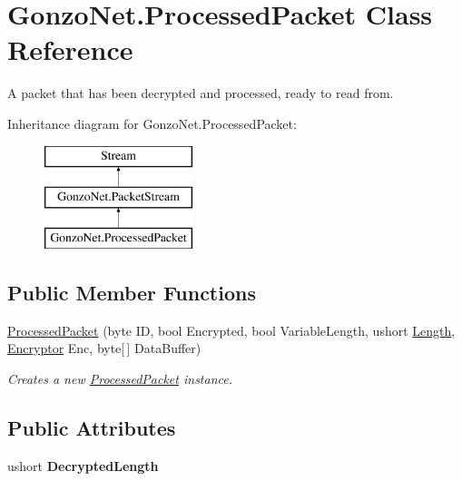 \hypertarget{class_gonzo_net_1_1_processed_packet}{\section{Gonzo\+Net.\+Processed\+Packet Class Reference}
\label{class_gonzo_net_1_1_processed_packet}
}


A packet that has been decrypted and processed, ready to read from.  


Inheritance diagram for Gonzo\+Net.\+Processed\+Packet\+:\begin{figure}[H]
\begin{center}
\leavevmode
\includegraphics[height=3.000000cm]{class_gonzo_net_1_1_processed_packet}
\end{center}
\end{figure}
\subsection*{Public Member Functions}
\begin{DoxyCompactItemize}
\item 
\hyperlink{class_gonzo_net_1_1_processed_packet_a4014676e6d46c7a2dd80d079f991bfc6}{Processed\+Packet} (byte I\+D, bool Encrypted, bool Variable\+Length, ushort \hyperlink{class_gonzo_net_1_1_packet_stream_a8d15de3e1c877c4e8dc19080b6f6d3ec}{Length}, \hyperlink{class_gonzo_net_1_1_encryption_1_1_encryptor}{Encryptor} Enc, byte\mbox{[}$\,$\mbox{]} Data\+Buffer)
\begin{DoxyCompactList}\small\item\em Creates a new \hyperlink{class_gonzo_net_1_1_processed_packet}{Processed\+Packet} instance. \end{DoxyCompactList}\end{DoxyCompactItemize}
\subsection*{Public Attributes}
\begin{DoxyCompactItemize}
\item 
\hypertarget{class_gonzo_net_1_1_processed_packet_ae5f8d67ef1d1067dfff1f101d9353877}{ushort {\bfseries Decrypted\+Length}}\label{class_gonzo_net_1_1_processed_packet_ae5f8d67ef1d1067dfff1f101d9353877}

\end{DoxyCompactItemize}
